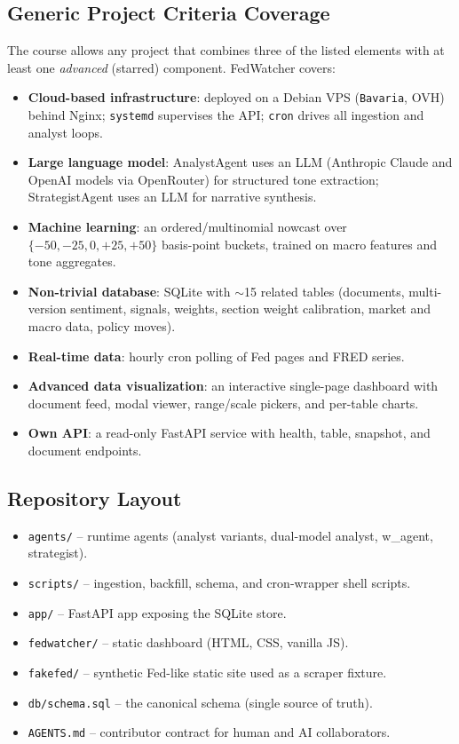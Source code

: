 \subsection{Generic Project Criteria Coverage}
The course allows any project that combines three of the listed elements with at least one \emph{advanced} (starred) component. FedWatcher covers:
\begin{itemize}[leftmargin=1.2em,itemsep=1pt]
  \item \textbf{Cloud-based infrastructure}: deployed on a Debian VPS (\texttt{Bavaria}, OVH) behind Nginx; \texttt{systemd} supervises the API; \texttt{cron} drives all ingestion and analyst loops.
  \item \textbf{Large language model}: AnalystAgent uses an LLM (Anthropic Claude and OpenAI models via OpenRouter) for structured tone extraction; StrategistAgent uses an LLM for narrative synthesis.
  \item \textbf{Machine learning}: an ordered/multinomial nowcast over $\{-50,-25,0,+25,+50\}$ basis-point buckets, trained on macro features and tone aggregates.
  \item \textbf{Non-trivial database}: SQLite with $\sim$15 related tables (documents, multi-version sentiment, signals, weights, section weight calibration, market and macro data, policy moves).
  \item \textbf{Real-time data}: hourly cron polling of Fed pages and FRED series.
  \item \textbf{Advanced data visualization}: an interactive single-page dashboard with document feed, modal viewer, range/scale pickers, and per-table charts.
  \item \textbf{Own API}: a read-only FastAPI service with health, table, snapshot, and document endpoints.
\end{itemize}

\subsection{Repository Layout}
\begin{itemize}[leftmargin=1.2em,itemsep=1pt]
  \item \texttt{agents/} -- runtime agents (analyst variants, dual-model analyst, w\_agent, strategist).
  \item \texttt{scripts/} -- ingestion, backfill, schema, and cron-wrapper shell scripts.
  \item \texttt{app/} -- FastAPI app exposing the SQLite store.
  \item \texttt{fedwatcher/} -- static dashboard (HTML, CSS, vanilla JS).
  \item \texttt{fakefed/} -- synthetic Fed-like static site used as a scraper fixture.
  \item \texttt{db/schema.sql} -- the canonical schema (single source of truth).
  \item \texttt{AGENTS.md} -- contributor contract for human and AI collaborators.
\end{itemize}
